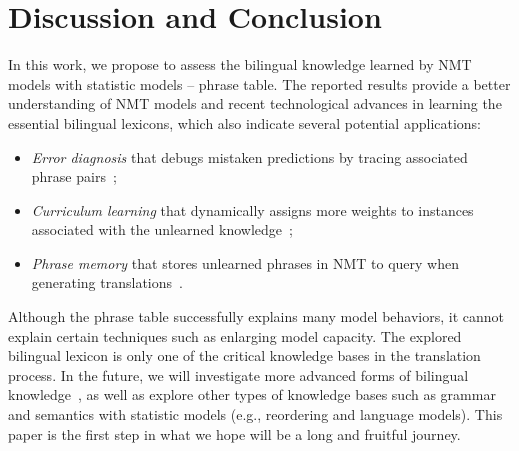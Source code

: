 \documentclass[11pt,a4paper]{article}
\begin{document}
\section{Discussion and Conclusion}

In this work, we propose to assess the bilingual knowledge learned by NMT models with statistic models -- phrase table. The reported results provide a better understanding of NMT models and recent technological advances in learning the essential bilingual lexicons, which also indicate several potential applications:
\begin{itemize}
    \item {\em Error diagnosis} that debugs mistaken predictions by tracing associated phrase pairs~\cite{ding2017visualizing};
    \item {\em Curriculum learning} that dynamically assigns more weights to instances associated with the unlearned knowledge~\cite{platanios2019competence};
    \item {\em Phrase memory} that stores unlearned phrases in NMT to query when generating translations~\cite{wang:2017:aaai,zhang2018prior}.
\end{itemize}

Although the phrase table successfully explains many model behaviors, it cannot explain certain techniques such as enlarging model capacity. The explored bilingual lexicon is only one of the critical knowledge bases in the translation process. In the future, we will investigate more advanced forms of bilingual knowledge~\cite{Liu:2006:ACL,Galley:2010:NAACL}, as well as explore other types of knowledge bases such as grammar and semantics with statistic models (e.g., reordering and language models). This paper is the first step in what we hope will be a long and fruitful journey.





\end{document}
